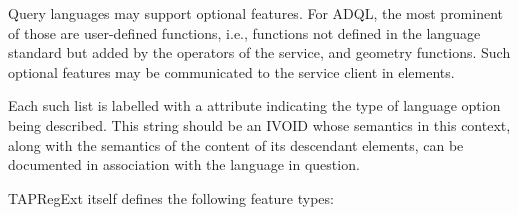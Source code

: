 \documentclass{ivoa}
\begin{document}


Query languages may support optional features.  For ADQL, the most prominent
of those are user-defined functions, i.e., functions not defined in the language
standard but added by the operators of the service, and geometry functions.
Such optional features may be communicated to the service client in
 elements.  

Each such list is labelled with a  attribute
indicating the type of language option being described.
This string should be an IVOID whose semantics in this context,
along with the semantics of the content of its descendant 
 elements,
can be documented in association with the language in question.

TAPRegExt itself defines the following feature types:
\end{document}
